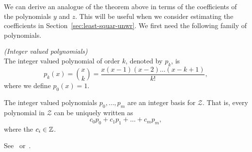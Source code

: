\documentclass[journal]{IEEEtran}
\begin{document}
We can derive an analogue of the theorem above in terms of the coefficients of the polynomials $y$ and $z$. This will be useful when we consider estimating the coefficients in Section~\ref{sec:least-squar-unwr}.  We first need the following family of polynomials. 

\begin{definition} \emph{(Integer valued polynomials)} \label{def:intvaledpolys}
\\The integer valued polynomial of order $k$, denoted by $p_k$, is
\[
p_k(x) = \binom{x}{k} = \frac{x(x-1)(x-2)\dots(x-k+1)}{k!},
\]
where we define $p_0(x) = 1$.
\end{definition}

\begin{lemma}\label{lem:intvalpol}
  The integer valued polynomials $p_0,\dots,p_m$ are an integer basis for $\mathcal{Z}$.  That is, every polynomial in $\mathcal{Z}$ can be uniquely written as
\begin{equation} \label{eq:lem_polynomial}
c_0 p_0 + c_1 p_1 + \dots + c_m p_m,
\end{equation}
where the $c_i \in {\mathbb Z}$.
\end{lemma}
\begin{IEEEproof}
See~\citep[p. 2]{cahen_integer-valued_1997} or~\cite{McKilliam2009IndentifiabliltyAliasingPolyphase}. 
\end{IEEEproof}
\end{document}
